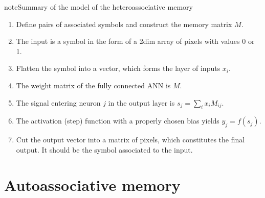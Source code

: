 \documentclass[a4paper,12pt,polish]{jupyterBook}
\begin{document}
\begin{sphinxadmonition}{note}{Summary of the model of the heteroassociative memory}
\begin{enumerate}
%
\item {} 
\sphinxAtStartPar
Define pairs of associated symbols and construct the memory matrix \(M\).

\item {} 
\sphinxAtStartPar
The input is a symbol in the form of a 2\sphinxhyphen{}dim array of pixels with values 0 or 1.

\item {} 
\sphinxAtStartPar
Flatten the symbol into a vector, which forms the layer of inputs \(x_i\).

\item {} 
\sphinxAtStartPar
The weight matrix of the fully connected ANN is \(M\).

\item {} 
\sphinxAtStartPar
The signal entering neuron \(j\) in the output layer is \(s_j=\sum_i x_i M_{ij}\).

\item {} 
\sphinxAtStartPar
The activation (step) function with a properly chosen bias yields \(y_j=f(s_j)\).

\item {} 
\sphinxAtStartPar
Cut the output vector into a matrix of pixels, which constitutes the final output.
It should be the symbol associated to the input.

\end{enumerate}
\end{sphinxadmonition}


\section{Autoassociative memory}
\label{\detokenize{docs/memory:autoassociative-memory}}
\end{document}
